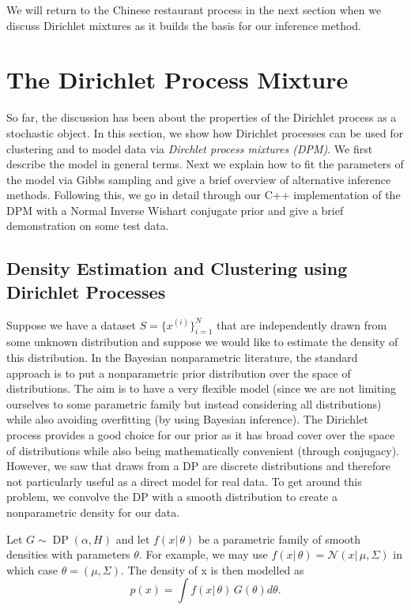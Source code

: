 \documentclass[final,3p,times,twocolumn]{elsarticle}
\DeclareMathOperator*{\DP}{DP}
\begin{document}
We will return to the Chinese restaurant process in the next section when we discuss Dirichlet mixtures as it builds the basis for our inference method.



\section{The Dirichlet Process Mixture}
\label{sect:DPM}
So far, the discussion has been about the properties of the Dirichlet process as a stochastic object.
In this section, we show how Dirichlet processes can be used for clustering and to model data via \emph{Dirchlet process mixtures (DPM)}.
We first describe the model in general terms.
Next we explain how to fit the parameters of the model via Gibbs sampling and give a brief overview of alternative inference methods.
Following this, we go in detail through our C++ implementation of the DPM with a Normal Inverse Wishart conjugate prior and give a brief demonstration on some test data.

\subsection{Density Estimation and Clustering using Dirichlet Processes}
Suppose we have a dataset $S = \{x^{(i)}\}_{i=1}^N$ that are independently drawn from some unknown distribution and suppose we would like to estimate the density of this distribution.
In the Bayesian nonparametric literature, the standard approach is to put a nonparametric prior distribution over the space of distributions.
The aim is to have a very flexible model (since we are not limiting ourselves to some parametric family but instead considering all distributions) while also avoiding overfitting (by using Bayesian inference).
The Dirichlet process provides a good choice for our prior as it has broad cover over the space of distributions while also being mathematically convenient (through conjugacy).
However, we saw that draws from a DP are discrete distributions and therefore not particularly useful as a direct model for real data.
To get around this problem, we convolve the DP with a smooth distribution to create a nonparametric density for our data.

Let $G \sim \DP(\alpha,H)$ and let $f(x|\,\theta)$ be a parametric family of smooth densities with parameters $\theta$. 
For example, we may use $f(x|\,\theta) = \mathcal{N}(x|\,\mu,\Sigma)$ in which case $\theta = (\mu,\Sigma)$.
The density of x is then modelled as 
\begin{equation}
p(x) = \int f(x|\,\theta)\, G(\theta)d\theta.
\end{equation}
\end{document}

